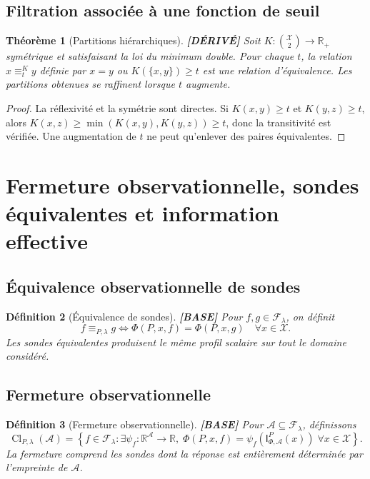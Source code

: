 \documentclass[11pt,a4paper]{article}
\newtheorem{definition}{Définition}[section]
\newtheorem{theorem}[definition]{Théorème}
\theoremstyle{remark}
\newcommand{\R}{\mathbb R}
\newcommand{\X}{\mathcal X}
\newcommand{\F}{\mathcal F}
\newcommand{\Cl}{\operatorname{Cl}}
\newcommand{\Emp}{\mathsf I}
\begin{document}
\subsection{Filtration associée à une fonction de seuil}
\begin{theorem}[Partitions hiérarchiques] \textbf{[DÉRIVÉ]}
Soit $K:\binom{\X}{2}\to\R_+$ symétrique et satisfaisant la loi du minimum double. Pour chaque $t$, la relation $x\equiv_t^K y$ définie par $x=y$ ou $K(\{x,y\})\geq t$ est une relation d'équivalence. Les partitions obtenues se raffinent lorsque $t$ augmente.
\end{theorem}
\begin{proof}
La réflexivité et la symétrie sont directes. Si $K(x,y)\geq t$ et $K(y,z)\geq t$, alors $K(x,z)\geq\min(K(x,y),K(y,z))\geq t$, donc la transitivité est vérifiée. Une augmentation de $t$ ne peut qu'enlever des paires équivalentes.
\end{proof}

\section{Fermeture observationnelle, sondes équivalentes et information effective}

\subsection{Équivalence observationnelle de sondes}
\begin{definition}[Équivalence de sondes] \textbf{[BASE]}
Pour $f,g\in\F_\lambda$, on définit
\[
f\equiv_{P,\lambda}g\iff\Phi(P,x,f)=\Phi(P,x,g)\quad\forall x\in\X.
\]
Les sondes équivalentes produisent le même profil scalaire sur tout le domaine considéré.
\end{definition}

\subsection{Fermeture observationnelle}
\begin{definition}[Fermeture observationnelle] \textbf{[BASE]}
Pour $\mathcal A\subseteq\F_\lambda$, définissons
\[
\boxed{\Cl_{P,\lambda}(\mathcal A)=\left\{f\in\F_\lambda:\exists\psi_f:\R^{\mathcal A}\to\R,\;\Phi(P,x,f)=\psi_f(\Emp_{\Phi,\mathcal A}^P(x))\;\forall x\in\X\right\}.}
\]
La fermeture comprend les sondes dont la réponse est entièrement déterminée par l'empreinte de $\mathcal A$.
\end{definition}
\end{document}
